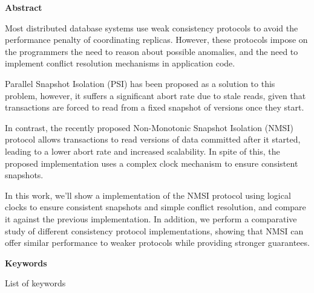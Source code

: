 \newpage

\begin{center}
{\bf \Huge Abstract}
\end{center}

\vspace{1cm}

Most distributed database systems use weak consistency protocols to avoid the
performance penalty of coordinating replicas. However, these protocols impose
on the programmers the need to reason about possible anomalies, and the need
to implement conflict resolution mechanisms in application code.

Parallel Snapshot Isolation (PSI) has been proposed as a solution to this
problem, however, it suffers a significant abort rate due to stale reads,
given that transactions are forced to read from a fixed snapshot of versions
once they start.

In contrast, the recently proposed Non-Monotonic Snapshot Isolation (NMSI)
protocol allows transactions to read versions of data committed after it
started, leading to a lower abort rate and increased scalability. In spite
of this, the proposed implementation uses a complex clock mechanism to ensure
consistent snapshots.

In this work, we'll show a implementation of the NMSI protocol using logical
clocks to ensure consistent snapshots and simple conflict resolution, and
compare it against the previous implementation. In addition, we perform a
comparative study of different consistency protocol implementations, showing
that NMSI can offer similar performance to weaker protocols while providing
stronger guarantees.

\vspace{1cm}

\begin{center}
{\bf \Large Keywords}
\end{center}

\vspace{0.5cm}

List of keywords
